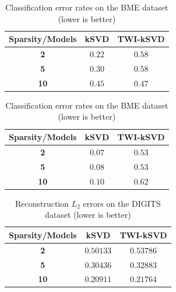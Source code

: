 \documentclass[10pt,twocolumn,letterpaper]{article}
\begin{document}
\begin{table}[!ht]
    \begin{minipage}{.55\linewidth}
      \centering
        \begin{tabular}{ccc}
            \toprule
            \textbf{Sparsity/Models} & \textbf{kSVD} & \textbf{TWI-kSVD} \\
            \midrule
            \textbf{2} & $\bm{0.22}$ & $0.58$ \\
            \textbf{5} & $0.30$ & $0.58$ \\
            \textbf{10} & $0.45$ & $0.47$ \\
            \bottomrule
        \end{tabular}
        \caption{Original classification strategy}
    \end{minipage}
    \begin{minipage}{.35\linewidth}
      \centering
        \begin{tabular}{ccc}
            \toprule
            \textbf{Sparsity/Models} & \textbf{kSVD} & \textbf{TWI-kSVD} \\
            \midrule
            \textbf{2} & $\bm{0.07}$ & $0.53$ \\
            \textbf{5} & $0.08$ & $0.53$ \\
            \textbf{10} & $0.10$ & $0.62$ \\
            \bottomrule
        \end{tabular}
        \caption{Our classification strategy}
    \end{minipage} 
    \caption{Classification error rates on the BME dataset (lower is better)}
    \label{tab:classif_results_BME}
\end{table}

\begin{table}[ht]
    \centering
        \begin{tabular}{ccc}
            \toprule
            \textbf{Sparsity/Models} & \textbf{kSVD} & \textbf{TWI-kSVD} \\
            \midrule
            \textbf{2} & $0.50133$ & $0.53786$ \\
            \textbf{5} & $0.30436$ & $0.32883$ \\
            \textbf{10} & $\bm{0.20911}$ & $0.21764$ \\
            \bottomrule
        \end{tabular}
    \caption{Reconstruction $L_2$ errors on the DIGITS dataset (lower is better)}
    \label{tab:reconstruction_results_DIGITS}
\end{table}
\end{document}
